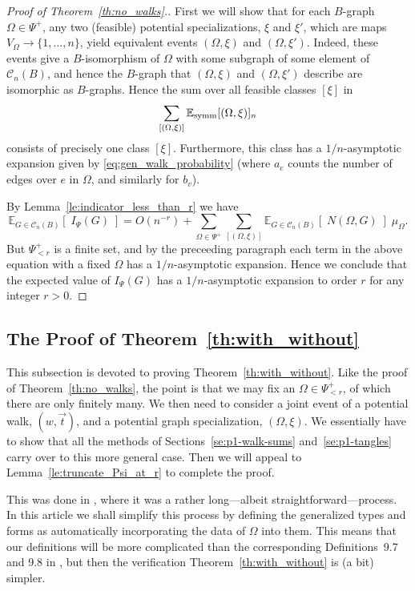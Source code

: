 \documentclass{memo-l}
\newcommand{\nonsigma}{\xi}
\theoremstyle{plain}
\theoremstyle{definition}
\numberwithin{section}{chapter}
\numberwithin{equation}{chapter}
\newcommand{\expect}[2]{{\mathbb{E}}_{#1}{\left[\; #2\; \right]}}
\theoremstyle{plain}
\theoremstyle{definition}
\newcommand\EE{\mathbb{E}}
\newcommand\cC{\mathcal{C}}
\begin{document}
\begin{proof}[Proof of Theorem~\ref{th:no_walks}.]
First we will show that for each $B$-graph
$\Omega\in\Psi^+$, any two (feasible)
potential specializations, $\nonsigma$ and $\nonsigma'$,
which are maps $V_\Omega\to\{1,\ldots,n\}$, yield 
equivalent events $(\Omega,\nonsigma)$ and $(\Omega,\nonsigma')$.
Indeed, these events give a $B$-isomorphism of $\Omega$ with some
subgraph of some element of $\cC_n(B)$, and hence the
$B$-graph that $(\Omega,\nonsigma)$ and
$(\Omega,\nonsigma')$ describe are isomorphic as $B$-graphs.
Hence the sum over all feasible classes $[\nonsigma]$ in
$$
\sum_{[(\Omega,\nonsigma)]} \EE_{\rm symm}[(\Omega,\nonsigma)]_n
$$
consists of precisely one class $[\nonsigma]$.  Furthermore, this
class has a $1/n$-asymptotic expansion given by
\eqref{eq:gen_walk_probability}
(where $a_e$ counts the number of edges over $e$ in $\Omega$, 
and similarly for $b_v$).

By Lemma~\ref{le:indicator_less_than_r} we have
$$
\expect{G\in\cC_n(B)}{I_\Psi(G)} =
O(n^{-r}) + \sum_{\Omega\in\Psi^+} \sum_{[(\Omega,\nonsigma)]} 
\expect{G\in\cC_n(B)}{N(\Omega,G)} \; \mu_\Omega.
$$
But $\Psi^+_{<r}$ is a finite set, and by the preceeding paragraph
each term in the above equation with a fixed $\Omega$ has a
$1/n$-asymptotic expansion.  Hence we conclude that the expected
value of $I_\Psi(G)$ has a $1/n$-asymptotic expansion to order 
$r$ for any integer $r>0$.
\end{proof}

\subsection{The Proof of Theorem~\ref{th:with_without}}

This subsection is devoted to proving Theorem~\ref{th:with_without}.
Like the proof of Theorem~\ref{th:no_walks}, the point is that we
may fix an $\Omega\in\Psi^+_{<r}$, of which there are only finitely
many. 
We then need to consider a joint event of a potential walk, $(w,\vec t)$,
and a potential graph specialization,
$(\Omega,\nonsigma)$.  We essentially have to show that all the
methods of Sections~\ref{se:p1-walk-sums} and~\ref{se:p1-tangles}
carry over to this more general case.
Then we will appeal to Lemma~\ref{le:truncate_Psi_at_r} to complete
the proof.

This was done in \cite{friedman_alon}, where it was
a rather long---albeit straightforward---process.
In this article we shall simplify this process by
defining the generalized types and forms as
automatically
incorporating the data of $\Omega$ into them.
This means that our definitions will be more complicated than the
corresponding Definitions~9.7 and 9.8 in \cite{friedman_alon},
but then the verification Theorem~\ref{th:with_without} is 
(a bit) simpler.
\end{document}
